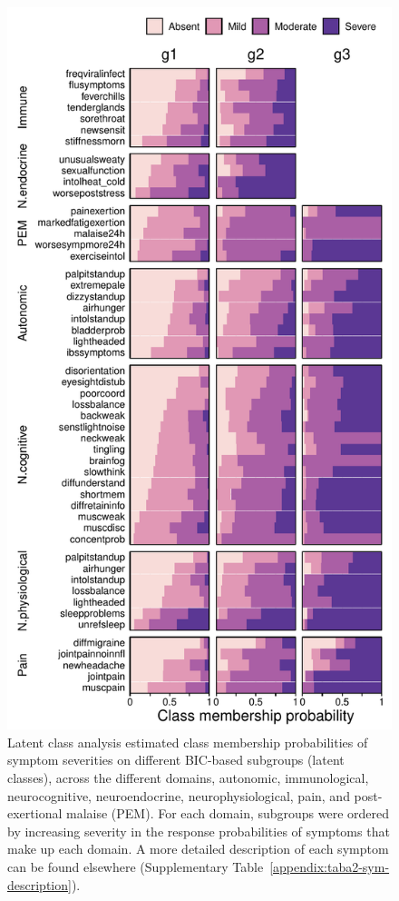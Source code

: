 \begin{figure}[h]
    \centering
    \includegraphics[height=0.7\paperheight]{chapter/2024-sym-domains/figures/figa3-lca-response-probabilities-bic-absent.pdf}
    \caption[Latent class analysis estimated class membership probabilities of symptom severities on different BIC-based subgroups, across the different domains]{Latent class analysis estimated class membership probabilities of symptom severities on different BIC-based subgroups (latent classes), across the different domains, autonomic, immunological, neurocognitive, neuroendocrine, neurophysiological, pain, and post-exertional malaise (PEM). For each domain, subgroups were ordered by increasing severity in the response probabilities of symptoms that make up each domain. A more detailed description of each symptom can be found elsewhere (Supplementary Table~\ref{appendix:taba2-sym-description}).}
    \label{appendix:figa3-lca-response-probabilities-bic-absent}
\end{figure}
